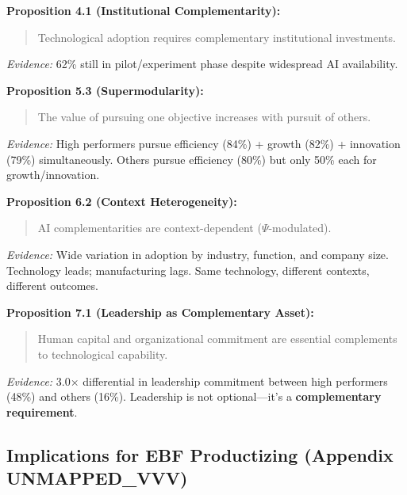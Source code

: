 \begin{tcolorbox}[colback=purple!5!white, colframe=purple!75!black,
    title=Empirical Support for EBF Propositions]

\textbf{Proposition 4.1 (Institutional Complementarity):}
\begin{quote}
Technological adoption requires complementary institutional investments.
\end{quote}
\textit{Evidence:} 62\% still in pilot/experiment phase despite widespread AI availability.

\vspace{0.5em}

\textbf{Proposition 5.3 (Supermodularity):}
\begin{quote}
The value of pursuing one objective increases with pursuit of others.
\end{quote}
\textit{Evidence:} High performers pursue efficiency (84\%) + growth (82\%) + innovation (79\%) simultaneously. Others pursue efficiency (80\%) but only 50\% each for growth/innovation.

\vspace{0.5em}

\textbf{Proposition 6.2 (Context Heterogeneity):}
\begin{quote}
AI complementarities are context-dependent ($\Psi$-modulated).
\end{quote}
\textit{Evidence:} Wide variation in adoption by industry, function, and company size. Technology leads; manufacturing lags. Same technology, different contexts, different outcomes.

\vspace{0.5em}

\textbf{Proposition 7.1 (Leadership as Complementary Asset):}
\begin{quote}
Human capital and organizational commitment are essential complements to technological capability.
\end{quote}
\textit{Evidence:} 3.0× differential in leadership commitment between high performers (48\%) and others (16\%). Leadership is not optional---it's a \textbf{complementary requirement}.

\end{tcolorbox}


\subsection{Implications for EBF Productizing (Appendix UNMAPPED_VVV)}

